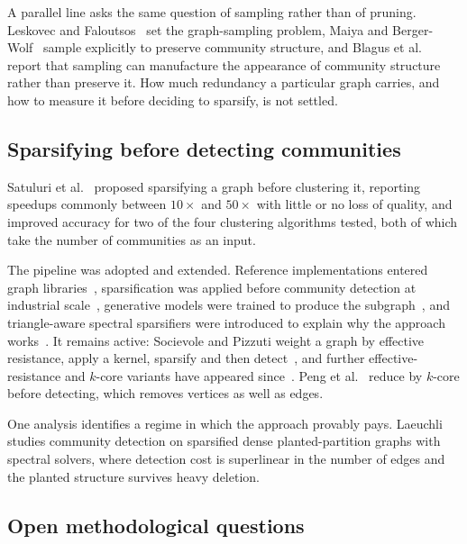 A parallel line asks the same question of sampling rather than of pruning.
Leskovec and Faloutsos~\cite{leskovec2006sampling} set the graph-sampling
problem, Maiya and Berger-Wolf~\cite{maiya2010sampling} sample explicitly to
preserve community structure, and Blagus et
al.~\cite{blagus2015sampling} report that sampling can manufacture the appearance
of community structure rather than preserve it. How much redundancy a particular
graph carries, and how to measure it before deciding to sparsify, is not settled.

\subsection{Sparsifying before detecting communities}\label{sec:background:pipeline}

Satuluri et al.~\cite{satuluri2011local} proposed sparsifying a graph before
clustering it, reporting speedups commonly between $10\times$ and $50\times$ with
little or no loss of quality, and improved accuracy for two of the four
clustering algorithms tested, both of which take the number of communities as an
input.

The pipeline was adopted and extended. Reference implementations entered graph
libraries~\cite{hamann2016structure}, sparsification was applied before community
detection at industrial scale~\cite{satuluri2020simclusters}, generative models
were trained to produce the subgraph~\cite{wu2020gsgan}, and triangle-aware
spectral sparsifiers were introduced to explain why the approach
works~\cite{sotiropoulos2021triangle}. It remains active: Socievole and Pizzuti
weight a graph by effective resistance, apply a kernel, sparsify and then
detect~\cite{socievole2024community, socievole2026effective}, and further
effective-resistance and $k$-core variants have appeared
since~\cite{pari2026effective, setiadi2025community}. Peng et
al.~\cite{peng2014accelerating} reduce by $k$-core before detecting, which
removes vertices as well as edges.

One analysis identifies a regime in which the approach provably pays.
Laeuchli~\cite{laeuchli2020fast} studies community detection on sparsified dense
planted-partition graphs with spectral solvers, where detection cost is
superlinear in the number of edges and the planted structure survives heavy
deletion.

\subsection{Open methodological questions}\label{sec:background:method}

